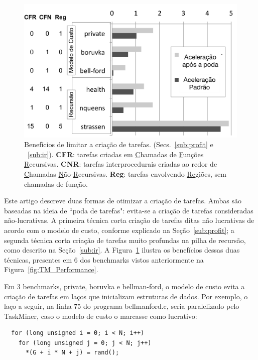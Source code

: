 \documentclass[sigplan,10pt,review]{acmart}
\newcommand\Taskminer{\mbox{\textsf{TaskMiner}}}
\begin{document}
\begin{figure}[b!]
\begin{center}
\includegraphics[width=1\columnwidth]{images/Optimizations}
\caption{Benefícios de limitar a criação de tarefas. (Secs.~\ref{sub:profit} e ~\ref{sub:ir}).
\textbf{CFR}: tarefas criadas em \underline{C}hamadas de \underline{F}unções \underline{R}ecursivas.
\textbf{CNR}: tarefas interprocedurais criadas ao redor de \underline{C}hamadas  \underline{N}ão-\underline{R}ecursivas.
\textbf{Reg}: tarefas envolvendo \underline{Reg}iões, sem chamadas de função.}
\label{fig:Optimizations}
\end{center}
\end{figure}

Este artigo descreve duas formas de otimizar a criação de tarefas. Ambas são baseadas na ideia de 
``poda de tarefas": evita-se a criação de tarefas consideradas não-lucrativas. A primeira técnica
corta criação de tarefas ditas não lucrativas de acordo com o modelo de custo, conforme explicado na 
Seção~\ref{sub:profit}; a segunda técnica corta criação de tarefas muito profundas na pilha de recursão, 
como descrito na Seção~\ref{sub:ir}. A Figura~\ref{fig:Optimizations} ilustra os benefícios dessas duas técnicas,
presentes em 6 dos benchmarks vistos anteriormente na Figura~\ref{fig:TM_Performance}.

Em 3 benchmarks, \textsf{private}, \textsf{boruvka} e
\textsf{bellman-ford}, o modelo de custo evita a criação de tarefas em laços que inicializam estruturas de dados.
Por exemplo, o laço a seguir, na linha 75 do programa \textsf{bellmanford.c}, seria paralelizado pelo
\Taskminer{}, caso o modelo de custo o marcasse como lucrativo:

\begin{verbatim}
  for (long unsigned i = 0; i < N; i++)
    for (long unsigned j = 0; j < N; j++)
      *(G + i * N + j) = rand();
\end{verbatim}
\end{document}
